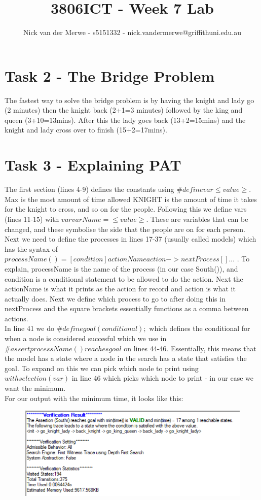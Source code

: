\documentclass{article}
\title{3806ICT - Week 7 Lab}
\author{Nick van der Merwe - s5151332 - nick.vandermerwe@griffithuni.edu.au}
\newcommand\tab[1][1cm]{\hspace*{#1}}
\begin{document}
\maketitle

\section*{Task 2 - The Bridge Problem}
The fastest way to solve the bridge problem is by 
having the knight and lady go (2 minutes) then the knight back
(2+1=3 minutes) followed by the king and queen (3+10=13mins). 
After this the lady goes back (13+2=15mins) and the knight
and lady cross over to finish (15+2=17mins).
\section*{Task 3 - Explaining PAT}
The first section (lines 4-9) defines the constants using 
$\#define var \leq value \geq$. Max is the most amount of time allowed
KNIGHT is the amount of time it takes for the knight to cross, and so on for
the people. Following this we define vars (lines 11-15) with 
$var varName = \leq value \geq$. These are variables
that can be changed, and these symbolise the side that the
people are on for each person. \\
\tab Next we need to define the processes in lines 17-37 
(usually called models) which has the syntax of 
$processName() = [condition]actionName{action} -> nextProcess [] ...$
. To explain, processName is the name of the process (in our case
South()), and condition is a conditional statement to be allowed
to do the action. Next the actionName is what it prints as 
the action for record and action is what it actually does. Next
we define which process to go to after doing this in nextProcess
and the square brackets essentially functions as a comma between
actions. \\
\tab In line 41 we do $\#define goal(conditional);$ which 
defines the conditional
for when a node is considered succesful which we use in 
$\#assert processName() reaches goal$ on lines 44-46. Essentially, 
this means that the model has a state where a node in the 
search has a state that satisfies the goal. To expand
on this we can pick which node to print using 
$with selection(var)$ in line 46 which picks which node to 
print - in our case we want the minimum.\\
For our output with the minimum time, it looks like this:
\begin{figure}[ht]
    \centering
    \includegraphics{imgs/verification.png}
\end{figure}
\end{document}
